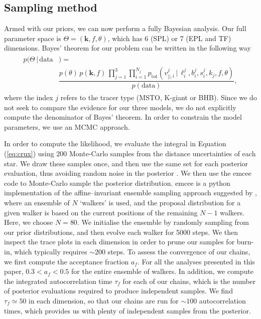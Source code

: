 \documentclass[useAMS,twocolumn,usenatbib]{mn2e}
\begin{document}
\subsection{Sampling method}
\label{sec:sampling_method}

Armed with our priors, we can now perform a fully Bayesian analysis. 
Our full parameter space is $\Theta =(\boldsymbol{k},f,\theta)$, which has 6 (SPL) or 7 (EPL and TF) dimensions. 
Bayes' theorem for our problem can be written in the following way
%
\begin{gather}
\begin{align}
p(\Theta \,| \,\mathrm{data}{}&) =  \nonumber \\
                    {}& \dfrac{p(\theta)\,p(\boldsymbol{k},f)\,\prod\limits_{j=1}^3
                    \prod\limits_{i=1}^{N_j}p_\mathrm{tot}(v_{||,i}^j \,|\, \ell_i^j,b_i^j,s_i^j,k_j,f,\theta)}{p(\mathrm{data})},
\end{align}
\label{eq:bayes}
\end{gather}
%
where the index $j$ refers to the tracer type (MSTO, K-giant or BHB). 
Since we do not seek to compare the evidence for our three models, we do not explicitly compute the denominator of Bayes' theorem. 
In order to constrain the model parameters, we use an MCMC approach.

In order to compute the likelihood, we evaluate the integral in Equation (\ref{eq:crux}) using 200 Monte-Carlo samples from the distance uncertainties of each star. 
We draw these samples once, and then use the same set for each posterior evaluation, thus avoiding random noise in the posterior \citep{Mc13}.
We then use the {\sc emcee} code \citep{emcee} to Monte-Carlo sample the posterior distribution. 
{\sc emcee} is a {\sc python} implementation of the affine--invariant ensemble sampling approach suggested by \citet{Go10}, where an ensemble of $N$ `walkers' is used, and the proposal distribution for a given walker is based on the current positions of the remaining $N-1$ walkers. 
Here, we choose $N=80$. We initialise the ensemble by randomly sampling from our prior distributions, and then evolve each walker for 5000 steps. 
We then inspect the trace plots in each dimension in order to prune our samples for burn-in, which typically requires $\sim 200$ steps. 
To assess the convergence of our chains, we first compute the acceptance fraction $a_f$.
For all the analyses presented in this paper, $0.3 < a_f < 0.5$ for the entire ensemble of walkers.
In addition, we compute the integrated autocorrelation time $\tau_f$ for each of our chains, which is the number of posterior evaluations required to produce independent samples.
We find $\tau_f \simeq 50$ in each dimension, so that our chains are run for $\sim 100$ autocorrelation times, which provides us with plenty of independent samples from the posterior.
\end{document}
